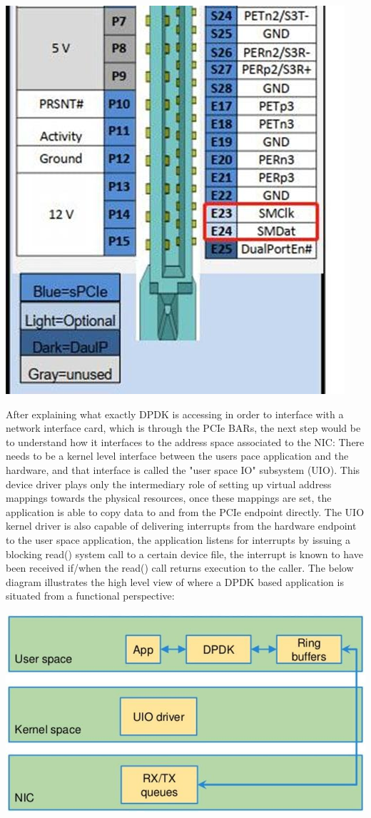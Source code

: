 \documentclass[a4paper,12p]{article}
\begin{document}
\includegraphics[width=\textwidth]{connector}

After explaining what exactly DPDK is accessing in order to interface with a network interface card, which is through the PCIe BARs, the next step would be to understand how it interfaces to the address space associated to the NIC: There needs to be a kernel level interface between the users pace application and the hardware, and that interface is called the "user space IO" subsystem (UIO). This device driver plays only the intermediary role of setting up virtual address mappings towards the physical resources, once these mappings are set, the application is able to copy data to and from the PCIe endpoint directly. The UIO kernel driver is also capable of delivering interrupts from the hardware endpoint to the user space application, the application listens for interrupts by issuing a blocking read() system call to a certain device file, the interrupt is known to have been received if/when the read() call returns execution to the caller. The below diagram illustrates the high level view of where a DPDK based application is situated from a functional perspective:

\includegraphics[width=\textwidth]{dpdkstack}
\end{document}
